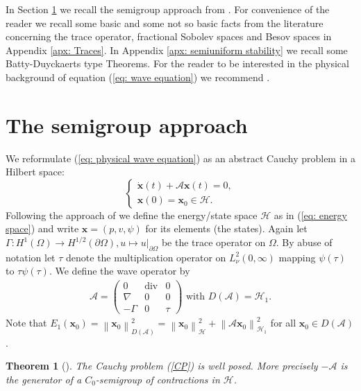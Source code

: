 \documentclass{amsart}
\newcommand{\norm}[1]{\left\| #1 \right\|}
\newcommand{\A}{\mathcal{A}}
\newcommand{\xnice}{\mathbf{x}}
\newcommand{\Ho}{\mathcal{H}}
\DeclareMathOperator{\Div}{div}
\newtheorem{Theorem}{Theorem}
\begin{document}
In Section \ref{sec: Semigroup approach} we recall the semigroup approach from \cite{DFMP2010a}. For convenience of the reader we recall some basic and some not so basic facts from the literature concerning the trace operator, fractional Sobolev spaces and Besov spaces in Appendix \ref{apx: Traces}. In Appendix \ref{apx: semiuniform stability} we recall some Batty-Duyckaerts type Theorems. For the reader to be interested in the physical background of equation (\ref{eq: wave equation}) we recommend \cite{IngardMorse}.

\section{The semigroup approach}\label{sec: Semigroup approach}
We reformulate (\ref{eq: physical wave equation}) as an abstract Cauchy problem in a Hilbert space:
\begin{equation}\label{CP}
 \begin{cases}
  \dot{\xnice}(t) + \A \xnice(t) = 0 , \\
  \xnice(0) = \xnice_0 \in \Ho .
 \end{cases}
\end{equation}
Following the approach of \cite{DFMP2010a} we define the energy/state space $\Ho$ as in (\ref{eq: energy space}) and write $\xnice=(p,v,\psi)$ for its elements (the states). Again let $\Gamma:H^1(\Omega)\rightarrow H^{1/2}(\partial\Omega), u\mapsto u|_{\partial\Omega}$ be the trace operator on $\Omega$. By abuse of notation let $\tau$ denote the multiplication operator on $L^2_{\nu}(0,\infty)$ mapping $\psi(\tau)$ to $\tau\psi(\tau)$. We define the wave operator by
\begin{align*}
 \A = \left(
 \begin{array}{ccc}
  0       & \Div & 0 \\
  \nabla  & 0    & 0 \\
  -\Gamma & 0    & \tau
 \end{array}\right)
 \text{ with }
 D(\A) = \Ho_1 .
\end{align*}
Note that $E_1(\xnice_0) = \norm{\xnice_0}_{D(\A)}^2 = \norm{\xnice_0}_{\Ho}^2 + \norm{\A \xnice_0}_{\Ho_1}^2$ for all $\xnice_0\in D(\A)$. 
\begin{Theorem}[\cite{DFMP2010a}]\label{thm: waves well posed}
 The Cauchy problem (\ref{CP}) is well posed. More precisely $-\A$ is the generator of a $C_0$-semigroup of contractions in $\Ho$.
\end{Theorem}
\end{document}
